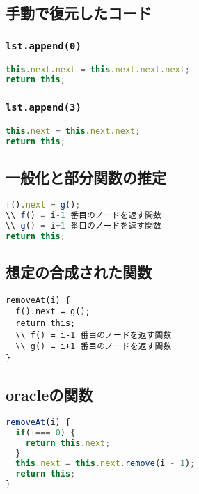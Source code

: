 \documentclass{article}
\begin{document}
\subsection{手動で復元したコード}

\subsubsection{\texttt{lst.append(0)}}
\begin{lstlisting}[language=JavaScript]
this.next.next = this.next.next.next;
return this;
\end{lstlisting}

\subsubsection{\texttt{lst.append(3)}}
\begin{lstlisting}[language=JavaScript]
this.next = this.next.next;
return this;
\end{lstlisting}

\subsection{一般化と部分関数の推定}

\begin{lstlisting}[language=JavaScript]
f().next = g(); 
\\ f() = i-1 番目のノードを返す関数
\\ g() = i+1 番目のノードを返す関数
return this;
\end{lstlisting}

\subsection{想定の合成された関数}
\begin{lstlisting}
removeAt(i) {
  f().next = g();
  return this;
  \\ f() = i-1 番目のノードを返す関数
  \\ g() = i+1 番目のノードを返す関数
}
\end{lstlisting}

\subsection{oracleの関数}
\begin{lstlisting}[language=JavaScript]
removeAt(i) {
  if(i=== 0) {
    return this.next;
  }
  this.next = this.next.remove(i - 1);
  return this;
}
\end{lstlisting}
\end{document}
